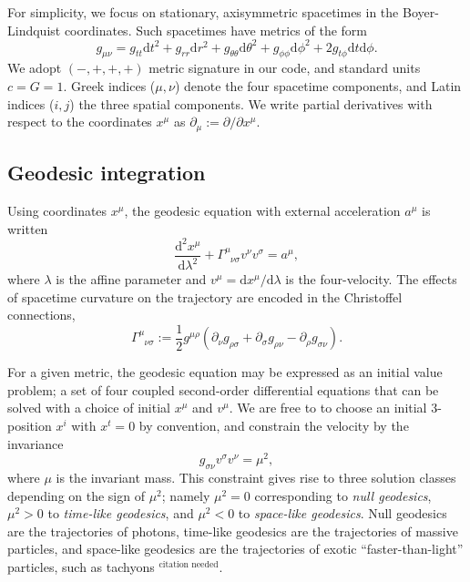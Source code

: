 \documentclass[fleqn,usenatbib]{mnras}
\newcommand{\citneeded}{{\bf \color{red} $^{\text{citation needed}}$}}
\renewcommand{\d}{\text{d}}
\newcommand{\utensor}[3]{#1^{#2}_{\phantom{#2}#3}}
\newcommand{\vel}[1]{v^{#1}}
\begin{document}
For simplicity, we focus on stationary, axisymmetric spacetimes in the
Boyer-Lindquist coordinates. Such spacetimes have metrics of the form
\begin{equation}
\label{eq:stationary_axisymmetric_metric}
    g_{\mu\nu}
    = g_{tt} \d t^2
    + g_{rr} \d r^2
    + g_{\theta\theta} \d \theta^2
    + g_{\phi\phi} \d \phi^2
    + 2g_{t\phi} \d t \d \phi.
\end{equation}
We adopt $(-, +, +, +)$ metric signature in our code, and standard units $c = G
= 1$. Greek indices ($\mu, \nu$) denote the four spacetime components, and Latin
indices ($i, j$) the three spatial components. We write partial derivatives with
respect to the coordinates $x^\mu$ as $\partial_\mu := \partial / \partial
x^\mu$.

\subsection{Geodesic integration}

Using coordinates $x^\mu$, the geodesic equation with external acceleration
$a^\mu$ is written
\begin{equation}
\label{eq:geodesic_equation}
    \frac{\d^2 x^\mu}{\d \lambda^2}
    + \utensor{\Gamma}{\mu}{\nu\sigma}
    \vel{\nu}
    \vel{\sigma}
    = a^\mu,
\end{equation}
where $\lambda$ is the affine parameter and $v^\mu = \d x^\mu / \d \lambda$ is
the four-velocity. The effects of spacetime curvature on the trajectory are
encoded in the Christoffel connections,
\begin{equation}
\label{eq:christoffel}
    \utensor{\Gamma}{\mu}{\nu\sigma}
    := \frac{1}{2} g^{\mu\rho}
    \left(
        \partial_{\nu}g_{\rho \sigma}
        + \partial_{\sigma}g_{\rho \nu}
        - \partial_{\rho}g_{\sigma \nu}
    \right).
\end{equation}

For a given metric, the geodesic equation may be expressed as an initial value
problem; a set of four coupled second-order differential equations that can be
solved with a choice of initial $x^\mu$ and $\vel{\mu}$. We are free to to
choose an initial 3-position $x^i$ with $x^t = 0$ by convention, and constrain
the velocity by the invariance
\begin{equation}
\label{eq:velocity_constraint}
    g_{\sigma\nu} \vel{\sigma} \vel{\nu} = \mu^2,
\end{equation}
where $\mu$ is the invariant mass. This constraint gives rise to three solution
classes depending on the sign of $\mu^2$; namely $\mu^2 = 0$ corresponding to
\emph{null geodesics}, $\mu^2 > 0$ to \emph{time-like geodesics}, and $\mu^2 <
0$ to \emph{space-like geodesics}. Null geodesics are the trajectories of
photons, time-like geodesics are the trajectories of massive particles, and
space-like geodesics are the trajectories of exotic ``faster-than-light''
particles, such as tachyons
\citneeded.
\end{document}
